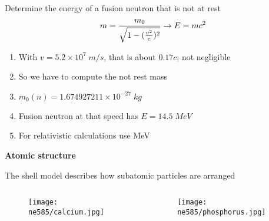 \documentclass[aspectratio=1610,pdftex,dvipsnames,compress,xcolor={dvipsnames}]{beamer}
\begin{document}
\begin{frame}{Determine the energy of a fusion neutron that is not at rest}
    \begin{equation}
        \LARGE 
        m = \frac{m_0}{\sqrt{1-(\frac{v^2}{c})^2}} \rightarrow E = m c^2
    \end{equation}
    
    \vspace*{\fill}

    \begin{enumerate}[series=outerlist,topsep=0pt,itemsep=21pt,leftmargin=*,label=(\arabic*)]
        \item[]With $v = 5.2 \times 10^7 \; m/s$, that is about $0.17c$; not negligible
        \item[]So we have to compute the not rest mass
        \item[]$m_0(n) = 1.674927211 \times 10^{-27} \; kg$
        \item[]Fusion neutron at that speed has $E = 14.5 \; MeV$
        \item[]For relativistic calculations use MeV
    \end{enumerate}
\end{frame}


\begin{frame}[plain]{}
    \centering\LARGE\textbf{Atomic structure}
\end{frame}


\addtocounter{framenumber}{-1}
\begin{frame}{The shell model describes how subatomic particles are arranged}
    \begin{columns}

        \begin{column}{0.50\textwidth}
            \begin{figure}
                \centering
                \texttt{[image: ne585/calcium.jpg]}
            \end{figure}
        \end{column}

        \begin{column}{0.50\textwidth}
            \begin{figure}
                \centering
                \texttt{[image: ne585/phosphorus.jpg]}
            \end{figure}
        \end{column}

    \end{columns}
\end{frame}
\end{document}
